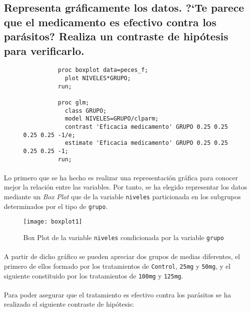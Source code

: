 \documentclass{article}
\begin{document}
    \subsection{Representa gráficamente los datos. ?`Te parece que el medicamento es efectivo contra los parásitos? Realiza un contraste de hipótesis para verificarlo.}

      \begin{figure}[h]
        \centering
        \begin{verbatim}
          proc boxplot data=peces_f;
            plot NIVELES*GRUPO;
          run;

          proc glm;
            class GRUPO;
            model NIVELES=GRUPO/clparm;
            contrast 'Eficacia medicamento' GRUPO 0.25 0.25 0.25 0.25 -1/e;
            estimate 'Eficacia medicamento' GRUPO 0.25 0.25 0.25 0.25 -1;
          run;
        \end{verbatim}
        \label{code:sas_3}
      \end{figure}

      \paragraph{}
      Lo primero que se ha hecho es realizar una representación gráfica para conocer mejor la relación entre las variables. Por tanto, se ha elegido representar los datos mediante un \emph{Box Plot} que de la variable \texttt{niveles} particionada en los subgrupos determinados por el tipo de \texttt{grupo}.

      \begin{figure}[H]
        \centering
        \texttt{[image: boxplot1]}
        \caption{Box Plot de la variable \texttt{niveles} condicionada por la variable \texttt{grupo}}
        \label{fig:figura_1}
      \end{figure}

      \paragraph{}
      A partir de dicho gráfico se pueden apreciar dos grupos de medias diferentes, el primero de ellos formado por los tratamientos de \texttt{Control}, \texttt{25mg} y \texttt{50mg}, y el siguiente constituido por los tratamientos de \texttt{100mg} y \texttt{125mg}.

      \paragraph{}
      Para poder asegurar que el tratamiento es efectivo contra los parásitos se ha realizado el siguiente contraste de hipótesis:
\end{document}
